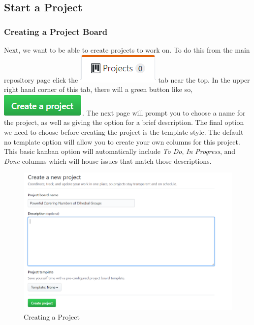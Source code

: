 \documentclass[11pt]{article}
\begin{document}
\hypertarget{proj-section}{\subsection{Start a Project}}

\subsubsection{Creating a Project Board}
Next, we want to be able to create projects to work on. To do this from the main repository page click the \includegraphics[scale=.5]{ProjectsTab.png} tab near the top. In the upper right hand corner of this tab, there will a green button like so, \includegraphics[scale=.5]{CreateAProject.png}. The next page will prompt you to choose a name for the project, as well as giving the option for a brief description. The final option we need to choose before creating the project is the template style. The default no template option will allow you to create your own columns for this project. This basic kanban option will automatically include \textit{To Do}, \textit{In Progress}, and \textit{Done} columns which will house issues that match those descriptions. 

\begin{center}
\begin{figure}[h!]
\includegraphics[scale=.6]{CreatingProject.png}
\caption{Creating a Project}
\end{figure}
\end{center} 
\end{document}
